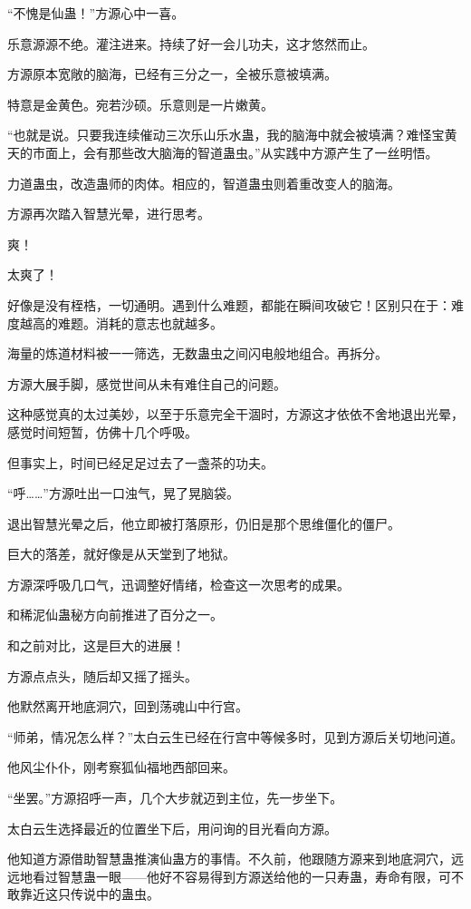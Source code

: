 \begin{this_body}
“不愧是仙蛊！”方源心中一喜。

乐意源源不绝。灌注进来。持续了好一会儿功夫，这才悠然而止。

方源原本宽敞的脑海，已经有三分之一，全被乐意被填满。

特意是金黄色。宛若沙硕。乐意则是一片嫩黄。

“也就是说。只要我连续催动三次乐山乐水蛊，我的脑海中就会被填满？难怪宝黄天的市面上，会有那些改大脑海的智道蛊虫。”从实践中方源产生了一丝明悟。

力道蛊虫，改造蛊师的肉体。相应的，智道蛊虫则着重改变人的脑海。

方源再次踏入智慧光晕，进行思考。

爽！

太爽了！

好像是没有桎梏，一切通明。遇到什么难题，都能在瞬间攻破它！区别只在于：难度越高的难题。消耗的意志也就越多。

海量的炼道材料被一一筛选，无数蛊虫之间闪电般地组合。再拆分。

方源大展手脚，感觉世间从未有难住自己的问题。

这种感觉真的太过美妙，以至于乐意完全干涸时，方源这才依依不舍地退出光晕，感觉时间短暂，仿佛十几个呼吸。

但事实上，时间已经足足过去了一盏茶的功夫。

“呼……”方源吐出一口浊气，晃了晃脑袋。

退出智慧光晕之后，他立即被打落原形，仍旧是那个思维僵化的僵尸。

巨大的落差，就好像是从天堂到了地狱。

方源深呼吸几口气，迅调整好情绪，检查这一次思考的成果。

和稀泥仙蛊秘方向前推进了百分之一。

和之前对比，这是巨大的进展！

方源点点头，随后却又摇了摇头。

他默然离开地底洞穴，回到荡魂山中行宫。

“师弟，情况怎么样？”太白云生已经在行宫中等候多时，见到方源后关切地问道。

他风尘仆仆，刚考察狐仙福地西部回来。

“坐罢。”方源招呼一声，几个大步就迈到主位，先一步坐下。

太白云生选择最近的位置坐下后，用问询的目光看向方源。

他知道方源借助智慧蛊推演仙蛊方的事情。不久前，他跟随方源来到地底洞穴，远远地看过智慧蛊一眼——他好不容易得到方源送给他的一只寿蛊，寿命有限，可不敢靠近这只传说中的蛊虫。


\end{this_body}
